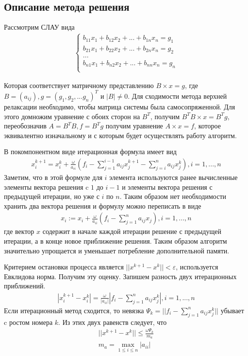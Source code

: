 \documentclass[a4paper,12pt,titlepage,finall]{article}
\begin{document}
\subsection{Описание метода решения}
Рассмотрим СЛАУ вида
\begin{align*}
\begin{cases}
b_{11} x_1 + b_{12} x_2 + ... + b_{1n} x_n = g_1\\
b_{21} x_1 + b_{22} x_2 + ... + b_{2n} x_n = g_2\\
...\\
b_{n1} x_1 + b_{n2} x_2 + ... + b_{nn} x_n = g_n\\
\end{cases}
\end{align*}
\par
Которая соответствует матричному представлению $B \times x = g$, где $B = (a_{ij}), g = (g_1, g_2, ... g_n)^T$ и $|B| \neq 0$. Для сходимости метода верхней релаксации необходимо, чтобы матрица системы была самосопряженной. Для этого домножим уравнение с обоих сторон на $B^T$, получим $B^T B \times x = B^T g$, переобозначив $A = B^T B, f = B^T g$ получим уравнение $A \times x = f$, которое эквивалентно изначальному и с которым будет осуществлять работу алгоритм.
\par
В покомпонентном виде итерационная формула имеет вид
\begin{align*}
x^{k+1}_i = x^k_i + \frac{\omega}{a_{ii}}\left(f_i - \sum\limits^{i-1}_{j=1}a_{ij}x^{k+1}_j - \sum\limits^{n}_{j=i}a_{ij}x^{k}_j\right), i = 1,...,n
\end{align*}
Заметим, что в этой формуле для $i$ элемента используются ранее вычисленные элементы вектора решения c $1$ до $i-1$ и элементы вектора решения с предыдущей итерации, но уже с $i$ по $n$. Таким образом нет необходимости хранить два вектора решения и формулу можно переписать в виде
\begin{align*}
x_i := x_i + \frac{\omega}{a_{ii}}\left(f_i - \sum\limits^{n}_{j=1}a_{ij}x_j\right), i = 1,...,n
\end{align*}
где вектор $x$ содержит в начале каждой итерации решение с предыдущей итерации, а в конце новое приближение решения. Таким образом алгоритм значительно упрощается и уменьшает потребление дополнительной памяти.
\par
Критерием остановки процесса является $||x^{k+1} - x^{k}|| < \varepsilon$, используется Евклидова норма. Получим эту оценку. Запишем разность двух итерационных приближений.
\begin{align*}
|x^{k+1}_i - x^k_i| = \frac{\omega}{|a_{ii}|} | f_i - \sum\limits^{n}_{j=1}a_{ij}x^k_j|, i = 1,...,n
\end{align*}
Если итерационный метод сходится, то невязка $\Psi_k = ||f_i - \sum\limits^{n}_{j=1}a_{ij}x^k_j||$ убывает c ростом номера $k$. Из этих двух равенств следует, что
\begin{align*}
||x^{k+1} - x^{k}|| \leq \frac{\omega \Psi_k}{m_a}\\
m_a = \max\limits_{1 \leq i \leq n} |a_{ii}|
\end{align*}
\end{document}
